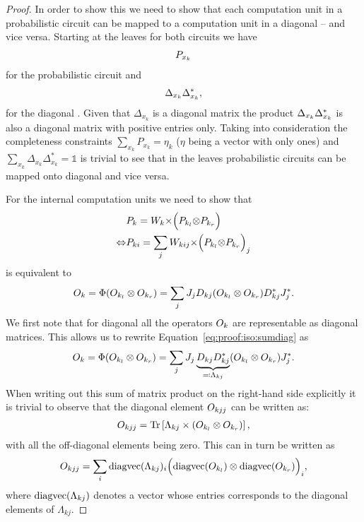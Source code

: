 \begin{proof}
	In order to show this we need to show that each computation unit in a probabilistic circuit can be mapped to a computation unit in a diagonal \punc -- and vice versa. Starting at the leaves for both circuits we have
	\begin{align}
		P_{x_k}
	\end{align}
	for the probabilistic circuit and
	\begin{align}
		\Delta_{x_k}  \Delta_{x_k}^*,
	\end{align}
	for the diagonal \punc. Given that $\Delta_{x_k}$ is a diagonal matrix the product $\Delta_{x_k}  \Delta_{x_k}^*$ is also a diagonal matrix with positive entries only. Taking into consideration the completeness constraints $\sum_{x_k} P_{x_k} = \eta_k $ ($\eta$ being a vector with only ones) and $\sum_{x_k} \Delta_{x_k} \Delta_{x_k}^* = \mathbb{1} $ is trivial to see that in the leaves probabilistic circuits can be mapped onto diagonal \puncs and vice versa.

	For the internal computation units we need to show that
	\begin{align}
		\phantom{\Leftrightarrow} &
		P_k
		=
		W_k {\times} \Bigl(P_{k_l} {\otimes} P_{k_r}\Bigr)
		\\
		\Leftrightarrow           &
		P_{ki}
		=
		\sum_j W_{kij} {\times} \Bigl(P_{k_l} {\otimes} P_{k_r}\Bigr)_j
		\label{eq:proof:iso:vecunit}
	\end{align}
	is equivalent to
	\begin{align}
		O_k = \Phi (O_{k_l} \otimes O_{k_r})
		=
		\sum_j J_j D_{kj} (O_{k_l} \otimes O_{k_r}) D^*_{kj} J_j^*.
		\label{eq:proof:iso:sumdiag}
	\end{align}
	We first note that for diagonal \puncs all the operators $O_k$ are representable as diagonal matrices. This allows us to rewrite Equation~\ref{eq:proof:iso:sumdiag} as
	\begin{align}
		O_k = \Phi (O_{k_l} \otimes O_{k_r})
		=
		\sum_j  J_j  \underbrace{ D_{kj} D^*_{kj}}_{\eqqcolon \Lambda_{kj}} (O_{k_l} \otimes O_{k_r})  J_j^*.
	\end{align}
	When writing out this sum of matrix product on the right-hand side explicitly it is trivial to observe that the diagonal element $O_{kjj}$ can be written as:
	\begin{align}
		O_{kjj}
		=
		\Tr \left[  \Lambda_{kj} \times (O_{k_l} \otimes O_{k_r}) \right],
	\end{align}
	with all the off-diagonal elements being zero. This can in turn be written as
	\begin{align}
		O_{kjj}
		=
		\sum_i  \text{diagvec} ( \Lambda_{kj} )_i  \Bigl( \text{diagvec} (O_{k_l}) \otimes \text{diagvec} (O_{k_r}) \Bigr)_i,
	\end{align}
	where $\text{diagvec} (\Lambda_{kj})$ denotes a vector whose entries corresponds to the diagonal elements of $\Lambda_{kj}$.


\end{proof}
